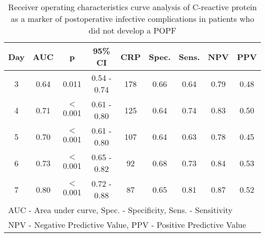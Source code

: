 \begin{table}[h]
	\centering
	\caption{Receiver operating characteristics curve analysis of C-reactive protein as a marker of postoperative infective complications in patients who did not develop a POPF}
	\label{table:crp_comp_ROC_infections_noPOPF}
	\renewcommand{\arraystretch}{1.4} %
	\begin{tabular}{| c | c c c | c c c c c |}
		\hline
		Day & AUC  & p        & 95\% CI     & CRP & Spec. & Sens. & NPV  & PPV               \\ \hline
		3   & 0.64 & 0.011    & 0.54 - 0.74 & 178 & 0.66  & 0.64  & 0.79 & 0.48              \\
		4   & 0.71 & $<$0.001 & 0.61 - 0.80 & 125 & 0.64  & 0.74  & 0.83 & 0.50              \\
		5   & 0.70 & $<$0.001 & 0.61 - 0.80 & 107 & 0.64  & 0.63  & 0.78 & 0.45              \\
		6   & 0.73 & $<$0.001 & 0.65 - 0.82 & 92  & 0.68  & 0.73  & 0.84 & 0.53              \\
		7   & 0.80 & $<$0.001 & 0.72 - 0.88 & 87  & 0.65  & 0.81  & 0.87 & 0.52              \\ \hline
		\multicolumn{9}{l}{AUC - Area under curve, Spec. - Specificity, Sens. - Sensitivity} \\
		\multicolumn{9}{l}{NPV - Negative Predictive Value, PPV - Positive Predictive Value}
	\end{tabular}
\end{table}